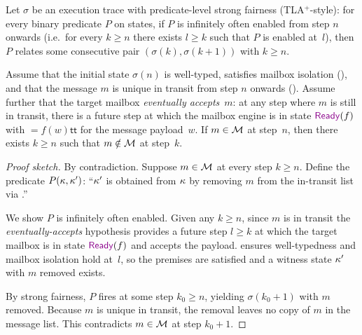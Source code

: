\documentclass[
  a4paper,        %
  techreport,     %
]{art}
\begin{document}
\begin{proposition}\label{prop:eventual-delivery}%
Let $\sigma$ be an execution trace with predicate-level strong
fairness (TLA$^{+}$-style): for every binary predicate $P$ on states, if
$P$ is infinitely often enabled from step $n$ onwards (i.e.\ for every
$k \geq n$ there exists $l \geq k$ such that $P$ is enabled at~$l$), then
$P$ relates some consecutive pair $(\sigma(k),\sigma(k+1))$ with $k \geq n$.

Assume that the initial state $\sigma(n)$ is well-typed, satisfies mailbox
isolation (), and that the message $m$ is unique
in transit from step $n$ onwards ().
Assume further that the target mailbox \emph{eventually accepts}~$m$: at any
step where $m$ is still in transit, there is a future step at which the
mailbox engine is in state $\ready{f}$ with $\equal{f(w)}{\mathsf{tt}}$ for
the message payload~$w$.
If $m \in \mathcal{M}$ at step~$n$, then there exists $k \geq n$ such that
$m \notin \mathcal{M}$ at step~$k$.
\end{proposition}
\begin{proof}[Proof sketch]
By contradiction. Suppose $m \in \mathcal{M}$ at every step $k \geq n$.
Define the predicate $P(\kappa, \kappa')$: ``$\kappa'$ is
obtained from $\kappa$ by removing $m$ from the in-transit list via
.''

We show $P$ is infinitely often enabled. Given any $k \geq n$, since $m$ is
in transit the \emph{eventually-accepts} hypothesis provides a future step
$l \geq k$ at which the target mailbox is in state $\ready{f}$ and accepts
the payload.
 ensures well-typedness and mailbox isolation hold
at~$l$, so the  premises are satisfied and a witness state
$\kappa'$ with $m$ removed exists.

By strong fairness, $P$ fires at some step $k_{0} \geq n$, yielding
$\sigma(k_{0}+1)$ with $m$ removed. Because $m$ is unique in transit, the
removal leaves no copy of $m$ in the message list.
This contradicts $m \in \mathcal{M}$ at step $k_{0}+1$.
\end{proof}
\end{document}
